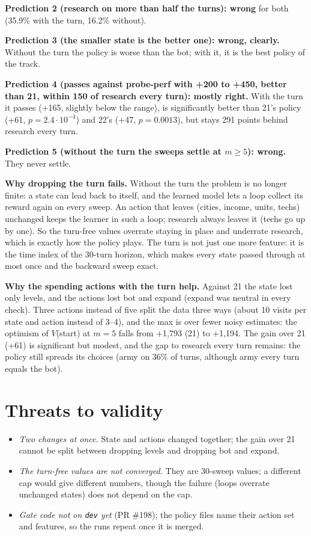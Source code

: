 \documentclass{../polyexp}
\begin{document}
\textbf{Prediction 2 (research on more than half the turns): wrong} for both (35.9\% with the turn, 16.2\% without).

\textbf{Prediction 3 (the smaller state is the better one): wrong, clearly.} Without the turn the policy is worse
than the bot; with it, it is the best policy of the track.

\textbf{Prediction 4 (passes against probe-perf with +200 to +450, better than 21, within 150 of research every
turn): mostly right.} With the turn it passes (+165, slightly below the range), is significantly better than 21's
policy (+61, $p = 2.4\cdot10^{-4}$) and 22's (+47, $p = 0.0013$), but stays 291 points behind research every turn.

\textbf{Prediction 5 (without the turn the sweeps settle at $m \ge 5$): wrong.} They never settle.

\textbf{Why dropping the turn fails.} Without the turn the problem is no longer finite: a state can lead back to
itself, and the learned model lets a loop collect its reward again on every sweep. An action that leaves (cities,
income, units, techs) unchanged keeps the learner in such a loop; research always leaves it (techs go up by one).
So the turn-free values overrate staying in place and underrate research, which is exactly how the policy plays. The
turn is not just one more feature: it is the time index of the 30-turn horizon, which makes every state passed
through at most once and the backward sweep exact.

\textbf{Why the spending actions with the turn help.} Against 21 the state lost only levels, and the actions lost
bot and expand (expand was neutral in every check). Three actions instead of five split the data three ways (about
10 visits per state and action instead of 3--4), and the max is over fewer noisy estimates: the optimism of
$V$(start) at $m=5$ falls from +1{,}793 (21) to +1{,}194. The gain over 21 (+61) is significant but modest, and the
gap to research every turn remains: the policy still spreads its choices (army on 36\% of turns, although army every
turn equals the bot).


\section{Threats to validity}
\begin{itemize}
  \item \emph{Two changes at once.} State and actions changed together; the gain over 21 cannot be split between
        dropping levels and dropping bot and expand.
  \item \emph{The turn-free values are not converged.} They are 30-sweep values; a different cap would give
        different numbers, though the failure (loops overrate unchanged states) does not depend on the cap.
  \item \emph{Gate code not on \texttt{dev} yet} (PR \#198); the policy files name their action set and features, so
        the runs repeat once it is merged.
\end{itemize}
\end{document}
